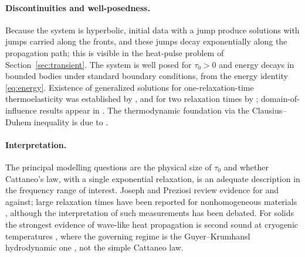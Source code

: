 \paragraph{Discontinuities and well-posedness.} Because the system is hyperbolic, initial data with a jump produce solutions with jumps carried along the fronts, and these jumps decay exponentially along the propagation path; this is visible in the heat-pulse problem of Section~\ref{sec:transient}. The system is well posed for $\tau_0>0$ and energy decays in bounded bodies under standard boundary conditions, from the energy identity \eqref{eq:energy}. Existence of generalized solutions for one-relaxation-time thermoelasticity was established by \citep{Bem1982}, and for two relaxation times by \citep{Bem1983}; domain-of-influence results appear in \citep{Ignaczak1980}. The thermodynamic foundation via the Clausius--Duhem inequality is due to \citep{GurtinWilliams1966}.

\paragraph{Interpretation.} The principal modelling questions are the physical size of $\tau_0$ and whether Cattaneo's law, with a single exponential relaxation, is an adequate description in the frequency range of interest. Joseph and Preziosi \citep{Joseph1989,Joseph1990} review evidence for and against; large relaxation times have been reported for nonhomogeneous materials \citep{Kaminski1990,Mitra1995}, although the interpretation of such measurements has been debated. For solids the strongest evidence of wave-like heat propagation is second sound at cryogenic temperatures \citep{Ackerman1966,Jackson1970}, where the governing regime is the Guyer--Krumhansl hydrodynamic one \citep{GuyerKrumhansl1966II}, not the simple Cattaneo law.


